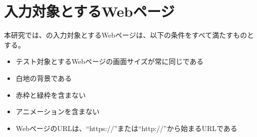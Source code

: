 


\section{入力対象とするWebページ}\label{sec:target_images}
本研究では、\toolName の入力対象とするWebページは、以下の条件をすべて満たすものとする。
\begin{itemize}
      \setlength{\itemsep}{0pt}
            \setlength{\parsep}{0pt}
      \item テスト対象とするWebページの画面サイズが常に同じである
      \item 白地の背景である
      \item 赤枠と緑枠を含まない
      \item アニメーションを含まない
      \item WebページのURLは、“https://”または“http://”から始まるURLである
\end{itemize}


